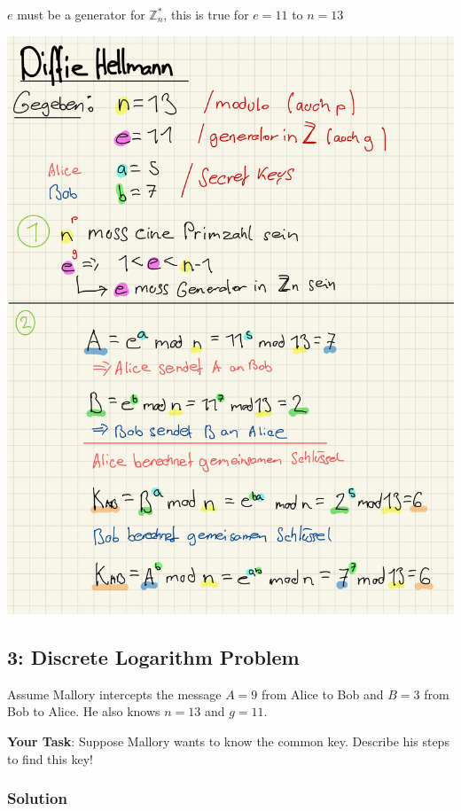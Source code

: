 \documentclass[11pt]{article}
\begin{document}
\(e\) must be a generator for \(\mathbb{Z}_n^*\), this is true for
\(e = 11\) to \(n=13\)


\begin{center}
	\includegraphics[scale=0.85]{img/diffieh.jpg}
\end{center}


    \hypertarget{discrete-logarithm-problem}{%
\subsection{3: Discrete Logarithm
Problem}\label{discrete-logarithm-problem}}

Assume Mallory intercepts the message \(A = 9\) from Alice to Bob and
\(B = 3\) from Bob to Alice. He also knows \(n = 13\) and \(g = 11\).

\textbf{Your Task}: Suppose Mallory wants to know the common key.
Describe his steps to find this key!

\hypertarget{solution}{%
\subsubsection{Solution}\label{solution}}
\end{document}
